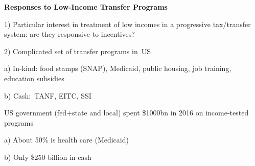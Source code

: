 \documentclass[landscape]{slides}
\begin{document}
%
%
%
%
%
%
%
%
%
%
%
%
%
%
%
%
%
%


\begin{slide}%
\begin{center}
{\bf Responses to Low-Income Transfer Programs}
\end{center}

1) Particular interest in treatment of low incomes in a
progressive tax/transfer system: are they responsive to incentives?

2) Complicated set of transfer programs in\ US

a) In-kind: food stamps (SNAP), Medicaid, public housing, job training,
education subsidies

b) Cash:\ TANF, EITC, SSI

US government (fed+state and local) spent \$1000bn in 2016 on
income-tested programs

a) About 50\% is health care (Medicaid)

b) Only \$250 billion in cash

\end{slide}
\end{document}
